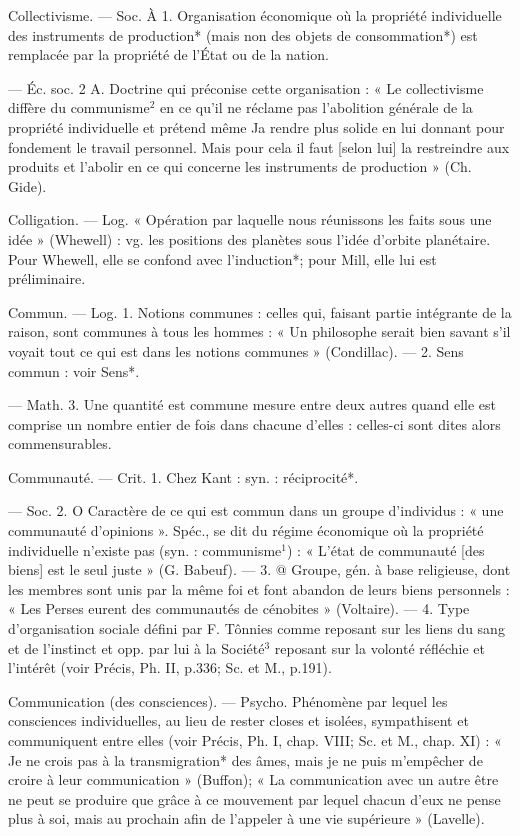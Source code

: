 Collectivisme. — Soc. À 1. Organisation économique où la propriété
individuelle des instruments de production* (mais non des objets de
consommation*) est remplacée par
la propriété de l’État ou de la nation.

— Éc. soc. 2 A. Doctrine qui préconise cette organisation : « Le collectivisme diffère du communisme$^2$
en ce qu'il ne réclame pas l'abolition
générale de la propriété individuelle
et prétend même Ja rendre plus
solide en lui donnant pour fondement le travail personnel. Mais pour
cela il faut [selon lui] la restreindre
aux produits et l’abolir en ce qui
concerne les instruments de production » (Ch. Gide).

Colligation. — Log. « Opération par
laquelle nous réunissons les faits
sous une idée » (Whewell) : vg. les
positions des planètes sous l’idée
d’orbite planétaire. Pour Whewell,
elle se confond avec l’induction*;
pour Mill, elle lui est préliminaire.

Commun. — Log. 1. Notions communes : celles qui, faisant partie intégrante de la raison, sont communes
à tous les hommes : « Un philosophe serait bien savant s’il voyait
tout ce qui est dans les notions
communes » (Condillac). — 2. Sens
commun : voir Sens*.

— Math. 3. Une quantité est
commune mesure entre deux autres
quand elle est comprise un nombre
entier de fois dans chacune d'elles :
celles-ci sont dites alors commensurables.

Communauté. — Crit. 1. Chez Kant :
syn. : réciprocité*.

— Soc. 2. O Caractère de ce qui
est commun dans un groupe d’individus : « une communauté d’opinions ». Spéc., se dit du régime économique où la propriété individuelle n'existe pas (syn. : communisme$^1$) : « L'état de communauté
[des biens] est le seul juste » (G. Babeuf). — 3. @ Groupe, gén. à base
religieuse, dont les membres sont
unis par la même foi et font abandon
de leurs biens personnels : « Les
Perses eurent des communautés de
cénobites » (Voltaire). — 4. Type
d'organisation sociale défini par
F. Tônnies comme reposant sur les
liens du sang et de l'instinct et opp.
par lui à la Société$^3$ reposant sur la
volonté réfléchie et l'intérêt (voir
Précis, Ph. II, p.336; Sc. et M., p.191).

Communication (des consciences). —
Psycho. Phénomène par lequel les
consciences individuelles, au lieu de
rester closes et isolées, sympathisent
et communiquent entre elles (voir
Précis, Ph. I, chap. VIII; Sc. et M.,
chap. XI) : « Je ne crois pas à la
transmigration* des âmes, mais je
ne puis m'empêcher de croire à leur
communication » (Buffon); « La
communication avec un autre être
ne peut se produire que grâce à ce
mouvement par lequel chacun d’eux
ne pense plus à soi, mais au prochain
afin de l’appeler à une vie supérieure » (Lavelle).

